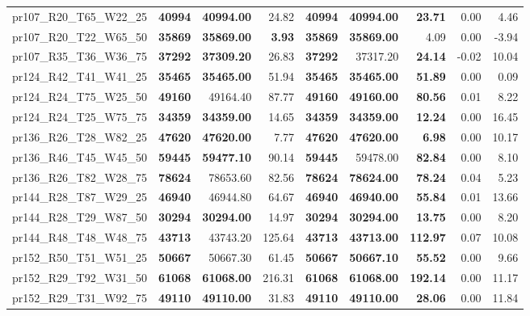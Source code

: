 \documentclass{singlecol-new}
\begin{document}
\begin{scriptsize}
\begin{longtable}{lrrrrrrrr}
		pr107\_R20\_T65\_W22\_25 & \textbf{40994} & \textbf{40994.00} & 24.82 & \textbf{40994} & \textbf{40994.00} & \textbf{23.71} & 0.00 & 4.46 \\
		pr107\_R20\_T22\_W65\_50 & \textbf{35869} & \textbf{35869.00} & \textbf{3.93} & \textbf{35869} & \textbf{35869.00} & 4.09 & 0.00 & -3.94 \\
		pr107\_R35\_T36\_W36\_75 & \textbf{37292} & \textbf{37309.20} & 26.83 & \textbf{37292} & 37317.20 & \textbf{24.14} & -0.02 & 10.04 \\
		pr124\_R42\_T41\_W41\_25 & \textbf{35465} & \textbf{35465.00} & 51.94 & \textbf{35465} & \textbf{35465.00} & \textbf{51.89} & 0.00 & 0.09 \\
		pr124\_R24\_T75\_W25\_50 & \textbf{49160} & 49164.40 & 87.77 & \textbf{49160} & \textbf{49160.00} & \textbf{80.56} & 0.01 & 8.22 \\
		pr124\_R24\_T25\_W75\_75 & \textbf{34359} & \textbf{34359.00} & 14.65 & \textbf{34359} & \textbf{34359.00} & \textbf{12.24} & 0.00 & 16.45 \\
		pr136\_R26\_T28\_W82\_25 & \textbf{47620} & \textbf{47620.00} & 7.77 & \textbf{47620} & \textbf{47620.00} & \textbf{6.98} & 0.00 & 10.17 \\
		pr136\_R46\_T45\_W45\_50 & \textbf{59445} & \textbf{59477.10} & 90.14 & \textbf{59445} & 59478.00 & \textbf{82.84} & 0.00 & 8.10 \\
		pr136\_R26\_T82\_W28\_75 & \textbf{78624} & 78653.60 & 82.56 & \textbf{78624} & \textbf{78624.00} & \textbf{78.24} & 0.04 & 5.23 \\
		pr144\_R28\_T87\_W29\_25 & \textbf{46940} & 46944.80 & 64.67 & \textbf{46940} & \textbf{46940.00} & \textbf{55.84} & 0.01 & 13.66 \\
		pr144\_R28\_T29\_W87\_50 & \textbf{30294} & \textbf{30294.00} & 14.97 & \textbf{30294} & \textbf{30294.00} & \textbf{13.75} & 0.00 & 8.20 \\
		pr144\_R48\_T48\_W48\_75 & \textbf{43713} & 43743.20 & 125.64 & \textbf{43713} & \textbf{43713.00} & \textbf{112.97} & 0.07 & 10.08 \\
		pr152\_R50\_T51\_W51\_25 & \textbf{50667} & 50667.30 & 61.45 & \textbf{50667} & \textbf{50667.10} & \textbf{55.52} & 0.00 & 9.66 \\
		pr152\_R29\_T92\_W31\_50 & \textbf{61068} & \textbf{61068.00} & 216.31 & \textbf{61068} & \textbf{61068.00} & \textbf{192.14} & 0.00 & 11.17 \\
		pr152\_R29\_T31\_W92\_75 & \textbf{49110} & \textbf{49110.00} & 31.83 & \textbf{49110} & \textbf{49110.00} & \textbf{28.06} & 0.00 & 11.84 \\

\end{longtable}
\end{scriptsize}
\end{document}

